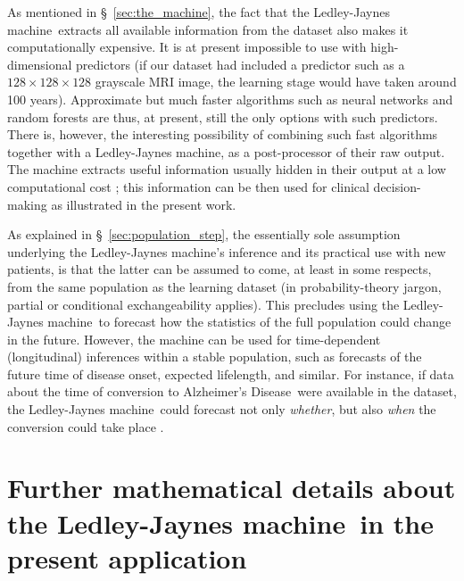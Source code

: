 \documentclass[utf8]{FrontiersinHarvard} %
\newcommand*{\sect}{\S}%
\newcommand*{\eg}{{e.g.}}
\newcommand*{\cf}{{cf.}}
\renewcommand*{\|}[1][]{\nonscript\:#1\vert\nonscript\:\mathopen{}}
\newcommand*{\ad}{Alzheimer's Disease}
\newcommand*{\ljm}{Ledley-Jaynes machine}
\begin{document}
As mentioned in \sect~\ref{sec:the_machine}, the fact that the \ljm\ extracts all available information from the dataset also makes it computationally expensive. It is at present impossible to use with high-dimensional predictors (if our dataset had included a predictor such as a $128\times128\times128$ grayscale MRI image, the learning stage would have taken around 100 years). Approximate but much faster algorithms such as neural networks and random forests are thus, at present, still the only options with such predictors. There is, however, the interesting possibility of combining such fast algorithms together with a \ljm, as a post-processor of their raw output. The machine extracts useful information usually hidden in their output at a low computational cost \citep{dyrlandetal2022b}; this information can be then used for clinical decision-making as illustrated in the present work.

As explained in \sect~\ref{sec:population_step}, the essentially sole assumption underlying the \ljm's inference and its practical use with new patients, is that the latter can be assumed to come, at least in some respects, from the same population as the learning dataset (in probability-theory jargon, partial or conditional exchangeability applies). This precludes using the \ljm\ to forecast how the statistics of the full population could change in the future. However, the machine can be used for time-dependent (longitudinal) inferences within a stable population, such as forecasts of the future time of disease onset, expected lifelength, and similar. For instance, if data about the time of conversion to \ad\ were available in the dataset, the \ljm\ could forecast not only \emph{whether}, but also \emph{when} the conversion could take place \citep[\cf\ \eg][]{delacruzmesiaetal2007}.


\bigskip%
\appendix
\renewcommand\thesection{\Alph{section}}
\section{Further mathematical details about the \ljm\ in the present application}
\label{sec:appendices}
\end{document}
